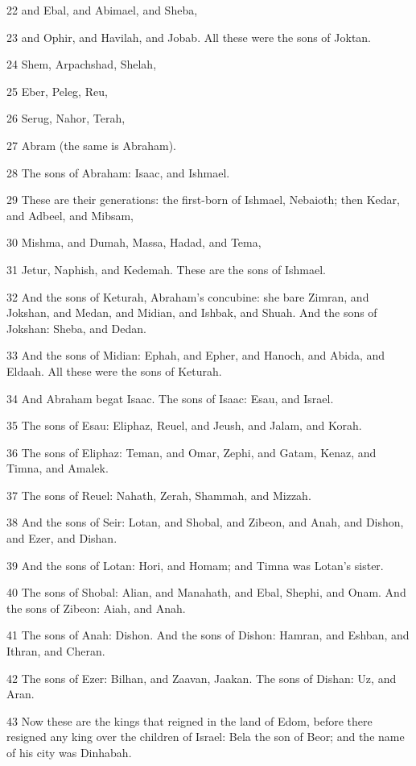 \par 22 and Ebal, and Abimael, and Sheba,
\par 23 and Ophir, and Havilah, and Jobab. All these were the sons of Joktan.
\par 24 Shem, Arpachshad, Shelah,
\par 25 Eber, Peleg, Reu,
\par 26 Serug, Nahor, Terah,
\par 27 Abram (the same is Abraham).
\par 28 The sons of Abraham: Isaac, and Ishmael.
\par 29 These are their generations: the first-born of Ishmael, Nebaioth; then Kedar, and Adbeel, and Mibsam,
\par 30 Mishma, and Dumah, Massa, Hadad, and Tema,
\par 31 Jetur, Naphish, and Kedemah. These are the sons of Ishmael.
\par 32 And the sons of Keturah, Abraham's concubine: she bare Zimran, and Jokshan, and Medan, and Midian, and Ishbak, and Shuah. And the sons of Jokshan: Sheba, and Dedan.
\par 33 And the sons of Midian: Ephah, and Epher, and Hanoch, and Abida, and Eldaah. All these were the sons of Keturah.
\par 34 And Abraham begat Isaac. The sons of Isaac: Esau, and Israel.
\par 35 The sons of Esau: Eliphaz, Reuel, and Jeush, and Jalam, and Korah.
\par 36 The sons of Eliphaz: Teman, and Omar, Zephi, and Gatam, Kenaz, and Timna, and Amalek.
\par 37 The sons of Reuel: Nahath, Zerah, Shammah, and Mizzah.
\par 38 And the sons of Seir: Lotan, and Shobal, and Zibeon, and Anah, and Dishon, and Ezer, and Dishan.
\par 39 And the sons of Lotan: Hori, and Homam; and Timna was Lotan's sister.
\par 40 The sons of Shobal: Alian, and Manahath, and Ebal, Shephi, and Onam. And the sons of Zibeon: Aiah, and Anah.
\par 41 The sons of Anah: Dishon. And the sons of Dishon: Hamran, and Eshban, and Ithran, and Cheran.
\par 42 The sons of Ezer: Bilhan, and Zaavan, Jaakan. The sons of Dishan: Uz, and Aran.
\par 43 Now these are the kings that reigned in the land of Edom, before there resigned any king over the children of Israel: Bela the son of Beor; and the name of his city was Dinhabah.
